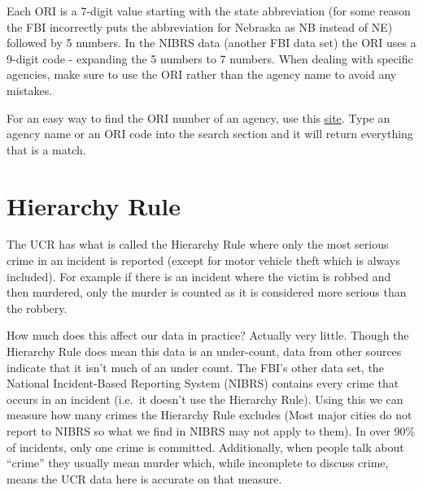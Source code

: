 \documentclass[
  12pt,
]{book}
\newenvironment{Shaded}{\begin{snugshade}}{\end{snugshade}}
\newcommand{\CommentTok}[1]{\textcolor[rgb]{0.37,0.37,0.37}{\textit{#1}}}
\newcommand{\DecValTok}[1]{\textcolor[rgb]{0.06,0.06,0.06}{#1}}
\newcommand{\KeywordTok}[1]{\textcolor[rgb]{0.27,0.27,0.27}{\textbf{#1}}}
\newcommand{\NormalTok}[1]{#1}
\newcommand{\OperatorTok}[1]{\textcolor[rgb]{0.43,0.43,0.43}{\textbf{#1}}}
\begin{document}
\begin{Shaded}
\end{Shaded}

Each ORI is a 7-digit value starting with the state abbreviation (for some reason the FBI incorrectly puts the abbreviation for Nebraska as NB instead of NE) followed by 5 numbers. In the NIBRS data (another FBI data set) the ORI uses a 9-digit code - expanding the 5 numbers to 7 numbers. When dealing with specific agencies, make sure to use the ORI rather than the agency name to avoid any mistakes.

For an easy way to find the ORI number of an agency, use this \href{http://crimedatatool.com/crosswalk.html}{site}. Type an agency name or an ORI code into the search section and it will return everything that is a match.

\hypertarget{hierarchy-rule}{%
\section{Hierarchy Rule}\label{hierarchy-rule}}

The UCR has what is called the Hierarchy Rule where only the most serious crime in an incident is reported (except for motor vehicle theft which is always included). For example if there is an incident where the victim is robbed and then murdered, only the murder is counted as it is considered more serious than the robbery.

How much does this affect our data in practice? Actually very little. Though the Hierarchy Rule does mean this data is an under-count, data from other sources indicate that it isn't much of an under count. The FBI's other data set, the National Incident-Based Reporting System (NIBRS) contains every crime that occurs in an incident (i.e.~it doesn't use the Hierarchy Rule). Using this we can measure how many crimes the Hierarchy Rule excludes (Most major cities do not report to NIBRS so what we find in NIBRS may not apply to them). In over 90\% of incidents, only one crime is committed. Additionally, when people talk about ``crime'' they usually mean murder which, while incomplete to discuss crime, means the UCR data here is accurate on that measure.
\end{document}

